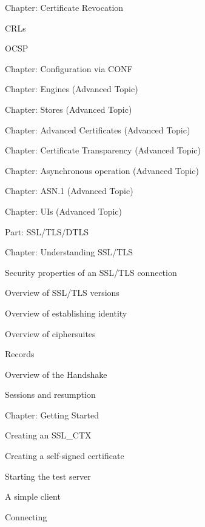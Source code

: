 \documentclass[oneside]{book}
\begin{document}
\begin{outline}
\begin{outline}
\begin{outline}
    \end{outline}
    \item{Chapter: Certificate Revocation}
    \begin{outline}
      \item{CRLs}
      \item{OCSP}
    \end{outline}
    \item{Chapter: Configuration via CONF}
    \item{Chapter: Engines (Advanced Topic)}
    \item{Chapter: Stores (Advanced Topic)}
    \item{Chapter: Advanced Certificates (Advanced Topic)}
    \item{Chapter: Certificate Transparency (Advanced Topic)}
    \item{Chapter: Asynchronous operation (Advanced Topic)}
    \item{Chapter: ASN.1 (Advanced Topic)}
    \item{Chapter: UIs (Advanced Topic)}
  \end{outline}
  \item{Part: SSL/TLS/DTLS}
  \begin{outline}
    \item{Chapter: Understanding SSL/TLS}
    \begin{outline}
      \item{Security properties of an SSL/TLS connection}
      \item{Overview of SSL/TLS versions}
      \item{Overview of establishing identity}
      \item{Overview of ciphersuites}
      \item{Records}
      \item{Overview of the Handshake}
      \item{Sessions and resumption}
    \end{outline}
    \item{Chapter: Getting Started}
    \begin{outline}
      \item{Creating an SSL\_CTX}
      \item{Creating a self-signed certificate}
      \item{Starting the test server}
      \item{A simple client}
      \begin{outline}
        \item{Connecting}

\end{outline}
\end{outline}
\end{outline}
\end{outline}
\end{document}
